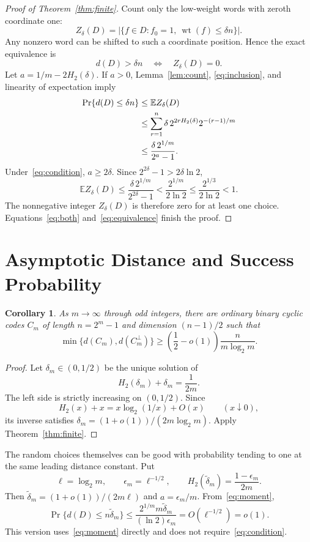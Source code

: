 \documentclass[12pt,letterpaper,onecolumn]{article}
\newtheorem{corollary}[theorem]{Corollary}
\theoremstyle{remark}
\newcommand{\E}{\mathbb E}
\newcommand{\wt}{\operatorname{wt}}
\begin{document}
\begin{proof}[Proof of Theorem~\ref{thm:finite}]
Count only the low-weight words with zeroth coordinate one:
\[
 Z_\delta(D)=|\{f\in D:f_0=1,\ \wt(f)\le\delta n\}|.
\]
Any nonzero word can be shifted to such a coordinate position. Hence the exact equivalence is
\begin{equation}
 d(D)>\delta n\quad\Longleftrightarrow\quad Z_\delta(D)=0.
 \label{eq:equivalence}
\end{equation}
Let $a=1/m-2H_2(\delta)$. If $a>0$, Lemma~\ref{lem:count}, \eqref{eq:inclusion}, and linearity of expectation imply
\begin{align}
 \Pr\{d(D)\le\delta n\}
 &\le\E Z_\delta(D)\notag\\
 &\le\sum_{r=1}^{n}\delta\,2^{2rH_2(\delta)}2^{-(r-1)/m}\notag\\
 &\le\frac{\delta\,2^{1/m}}{2^a-1}.
 \label{eq:moment}
\end{align}
Under~\eqref{eq:condition}, $a\ge2\delta$. Since $2^{2\delta}-1>2\delta\ln2$,
\begin{equation}
 \E Z_\delta(D)
 \le\frac{\delta\,2^{1/m}}{2^{2\delta}-1}
 <\frac{2^{1/m}}{2\ln2}
 \le\frac{2^{1/3}}{2\ln2}<1.
 \label{eq:lessone}
\end{equation}
The nonnegative integer $Z_\delta(D)$ is therefore zero for at least one choice. Equations~\eqref{eq:both} and~\eqref{eq:equivalence} finish the proof.
\end{proof}

\section{Asymptotic Distance and Success Probability}
\begin{corollary}\label{cor:asymptotic}
As $m\to\infty$ through odd integers, there are ordinary binary cyclic codes $C_m$ of length $n=2^m-1$ and dimension $(n-1)/2$ such that
\begin{equation}
 \min\{d(C_m),d(C_m^\perp)\}
 \ge\left(\frac12-o(1)\right)\frac{n}{m\log_2m}.
 \label{eq:asymptotic}
\end{equation}
\end{corollary}
\begin{proof}
Let $\delta_m\in(0,1/2)$ be the unique solution of
\[
 H_2(\delta_m)+\delta_m=\frac1{2m}.
\]
The left side is strictly increasing on $(0,1/2)$. Since
\[
 H_2(x)+x=x\log_2(1/x)+O(x)\qquad(x\downarrow0),
\]
its inverse satisfies $\delta_m=(1+o(1))/(2m\log_2m)$. Apply Theorem~\ref{thm:finite}.
\end{proof}

The random choices themselves can be good with probability tending to one at the same leading distance constant. Put
\[
 \ell=\log_2m,\qquad \epsilon_m=\ell^{-1/2},\qquad
 H_2(\widetilde\delta_m)=\frac{1-\epsilon_m}{2m}.
\]
Then $\widetilde\delta_m=(1+o(1))/(2m\ell)$ and $a=\epsilon_m/m$. From~\eqref{eq:moment},
\begin{equation}
 \Pr\{d(D)\le n\widetilde\delta_m\}
 \le\frac{2^{1/m}m\widetilde\delta_m}{(\ln2)\epsilon_m}
 =O(\ell^{-1/2})=o(1).
 \label{eq:whp}
\end{equation}
This version uses~\eqref{eq:moment} directly and does not require~\eqref{eq:condition}.
\end{document}
